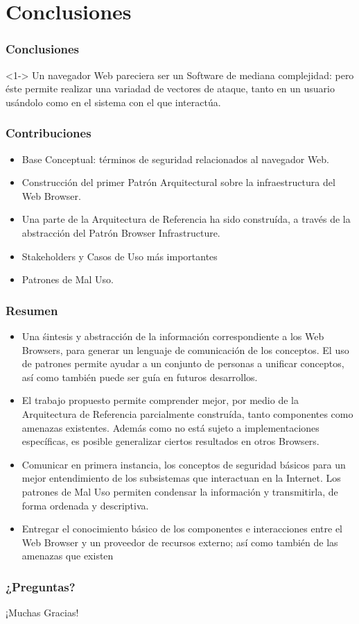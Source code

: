 \documentclass[serif,9pt]{beamer}
\begin{document}
\section{Conclusiones}
\begin{frame}
	\frametitle{Conclusiones}
	\begin{block}<1->{}
		Un navegador Web pareciera ser un Software de mediana complejidad: pero éste permite realizar una variadad de vectores de ataque, tanto en un usuario usándolo como en el sistema con el que 
	interactúa.
	\end{block}
\end{frame}

\begin{frame}
	\frametitle{Contribuciones}	
	\begin{itemize}
		\item<1-> Base Conceptual: términos de seguridad relacionados al navegador Web.
		\item<2-> Construcción del primer Patrón Arquitectural sobre la infraestructura del Web Browser.
		\item<3-> Una parte de la Arquitectura de Referencia ha sido construída, a través de la abstracción del Patrón Browser Infrastructure.
		\item<4-> Stakeholders y Casos de Uso más importantes
		\item<5-> Patrones de Mal Uso.
	\end{itemize}
\end{frame}

\begin{frame}
	\frametitle{Resumen}	
	\begin{itemize}
		\item<1-> Una śintesis y abstracción de la información correspondiente a los Web Browsers, para generar un lenguaje de comunicación de los conceptos. El uso de patrones permite ayudar a un conjunto de personas a unificar conceptos, así como también puede ser guía en futuros desarrollos.
		\item<2-> El trabajo propuesto permite comprender mejor, por medio de la Arquitectura de Referencia parcialmente construída, tanto componentes como amenazas existentes. Además como no está sujeto a implementaciones específicas, es posible generalizar ciertos resultados en otros Browsers.
		\item<3-> Comunicar en primera instancia, los conceptos de seguridad básicos para un mejor entendimiento de los subsistemas que interactuan en la Internet. Los patrones de Mal Uso permiten condensar la información y transmitirla, de forma ordenada y descriptiva.
		\item<4-> Entregar el conocimiento básico de los componentes e interacciones entre el Web Browser y un proveedor de recursos externo; así como también de las amenazas que existen
	\end{itemize}
\end{frame}

\begin{frame}
	\frametitle{¿Preguntas?}
	¡Muchas Gracias!	
\end{frame}



\end{document}
